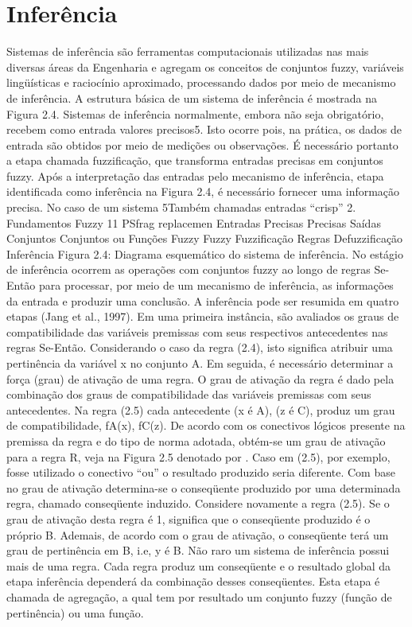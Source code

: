 \section{Inferência}
Sistemas de inferência são ferramentas computacionais utilizadas nas mais diversas áreas
da Engenharia e agregam os conceitos de conjuntos fuzzy, variáveis lingüísticas e raciocínio
aproximado, processando dados por meio de mecanismo de inferência. A estrutura básica de
um sistema de inferência é mostrada na Figura 2.4.
Sistemas de inferência normalmente, embora não seja obrigatório, recebem como entrada
valores precisos5. Isto ocorre pois, na prática, os dados de entrada são obtidos por meio de
medições ou observações. É necessário portanto a etapa chamada fuzzificação, que transforma
entradas precisas em conjuntos fuzzy.
Após a interpretação das entradas pelo mecanismo de inferência, etapa identificada como
inferência na Figura 2.4, é necessário fornecer uma informação precisa. No caso de um sistema
5Também chamadas entradas “crisp”
2. Fundamentos Fuzzy 11
PSfrag replacemen
Entradas
Precisas Precisas
Saídas
Conjuntos Conjuntos ou Funções
Fuzzy Fuzzy
Fuzzificação
Regras
Defuzzificação
Inferência
Figura 2.4: Diagrama esquemático do sistema de inferência.
No estágio de inferência ocorrem as operações com conjuntos fuzzy ao longo de regras Se-
Então para processar, por meio de um mecanismo de inferência, as informações da entrada e
produzir uma conclusão.
A inferência pode ser resumida em quatro etapas (Jang et al., 1997). Em uma primeira
instância, são avaliados os graus de compatibilidade das variáveis premissas com seus respectivos
antecedentes nas regras Se-Então. Considerando o caso da regra (2.4), isto significa
atribuir uma pertinência da variável x no conjunto A.
Em seguida, é necessário determinar a força (grau) de ativação de uma regra. O grau de
ativação da regra é dado pela combinação dos graus de compatibilidade das variáveis premissas
com seus antecedentes. Na regra (2.5) cada antecedente (x é A), (z é C), produz um grau
de compatibilidade, fA(x), fC(z). De acordo com os conectivos lógicos presente na premissa
da regra e do tipo de norma adotada, obtém-se um grau de ativação para a regra R, veja na
Figura 2.5 denotado por . Caso em (2.5), por exemplo, fosse utilizado o conectivo “ou” o
resultado produzido seria diferente.
Com base no grau de ativação determina-se o conseqüente produzido por uma determinada
regra, chamado conseqüente induzido. Considere novamente a regra (2.5). Se o grau de
ativação desta regra é 1, significa que o conseqüente produzido é o próprio B. Ademais, de
acordo com o grau de ativação, o conseqüente terá um grau de pertinência em B, i.e, y é B.
Não raro um sistema de inferência possui mais de uma regra. Cada regra produz um
conseqüente e o resultado global da etapa inferência dependerá da combinação desses conseqüentes.
Esta etapa é chamada de agregação, a qual tem por resultado um conjunto fuzzy
(função de pertinência) ou uma função.

